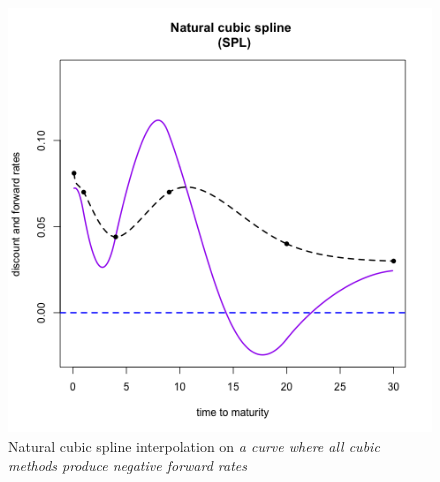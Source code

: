\begin{figure}[!htb]
\begin{minipage}{0.5\textwidth}
        \includegraphics[width=1.06\linewidth, height=0.285\textheight]{gfx/chapter-yc-insurance/construction_graph16}
        \caption{Natural cubic spline interpolation on \textit{a curve where all cubic methods produce negative forward rates}}
        \label{fig:hagan2006examples2}
    \end{minipage}
  \end{figure}
  
